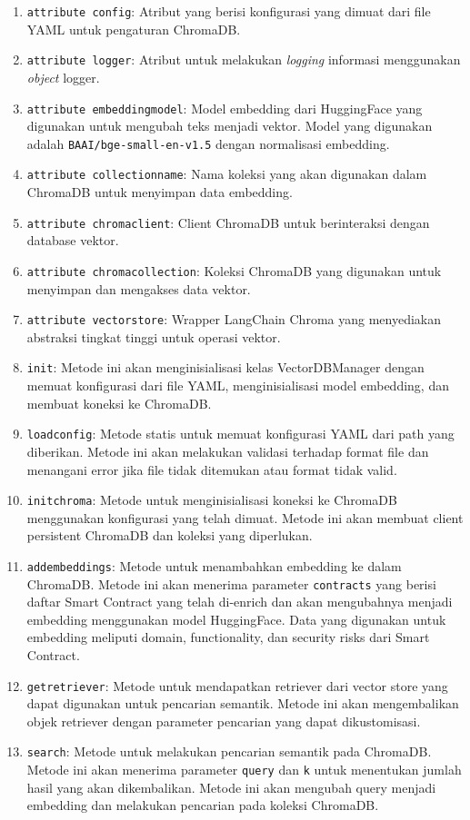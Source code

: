 \begin{enumerate}
    \item \texttt{attribute config}: Atribut yang berisi konfigurasi yang dimuat dari file YAML untuk pengaturan ChromaDB.
    \item \texttt{attribute logger}: Atribut untuk melakukan \textit{logging} informasi menggunakan \textit{object} logger.
    \item \texttt{attribute embedding\textunderscore model}: Model embedding dari HuggingFace yang digunakan untuk mengubah teks menjadi vektor. Model yang digunakan adalah \texttt{BAAI/bge-small-en-v1.5} dengan normalisasi embedding.
    \item \texttt{attribute collection\textunderscore name}: Nama koleksi yang akan digunakan dalam ChromaDB untuk menyimpan data embedding.
    \item \texttt{attribute chroma\textunderscore client}: Client ChromaDB untuk berinteraksi dengan database vektor.
    \item \texttt{attribute chroma\textunderscore collection}: Koleksi ChromaDB yang digunakan untuk menyimpan dan mengakses data vektor.
    \item \texttt{attribute vectorstore}: Wrapper LangChain Chroma yang menyediakan abstraksi tingkat tinggi untuk operasi vektor.
    \item \texttt{\textunderscore\textunderscore init\textunderscore\textunderscore}: Metode ini akan menginisialisasi kelas VectorDBManager dengan memuat konfigurasi dari file YAML, menginisialisasi model embedding, dan membuat koneksi ke ChromaDB.
    \item \texttt{load\textunderscore config}: Metode statis untuk memuat konfigurasi YAML dari path yang diberikan. Metode ini akan melakukan validasi terhadap format file dan menangani error jika file tidak ditemukan atau format tidak valid.
    \item \texttt{init\textunderscore chroma}: Metode untuk menginisialisasi koneksi ke ChromaDB menggunakan konfigurasi yang telah dimuat. Metode ini akan membuat client persistent ChromaDB dan koleksi yang diperlukan.
    \item \texttt{add\textunderscore embeddings}: Metode untuk menambahkan embedding ke dalam ChromaDB. Metode ini akan menerima parameter \texttt{contracts} yang berisi daftar Smart Contract yang telah di-enrich dan akan mengubahnya menjadi embedding menggunakan model HuggingFace. Data yang digunakan untuk embedding meliputi domain, functionality, dan security risks dari Smart Contract.
    \item \texttt{get\textunderscore retriever}: Metode untuk mendapatkan retriever dari vector store yang dapat digunakan untuk pencarian semantik. Metode ini akan mengembalikan objek retriever dengan parameter pencarian yang dapat dikustomisasi.
    \item \texttt{search}: Metode untuk melakukan pencarian semantik pada ChromaDB. Metode ini akan menerima parameter \texttt{query} dan \texttt{k} untuk menentukan jumlah hasil yang akan dikembalikan. Metode ini akan mengubah query menjadi embedding dan melakukan pencarian pada koleksi ChromaDB.
\end{enumerate}

